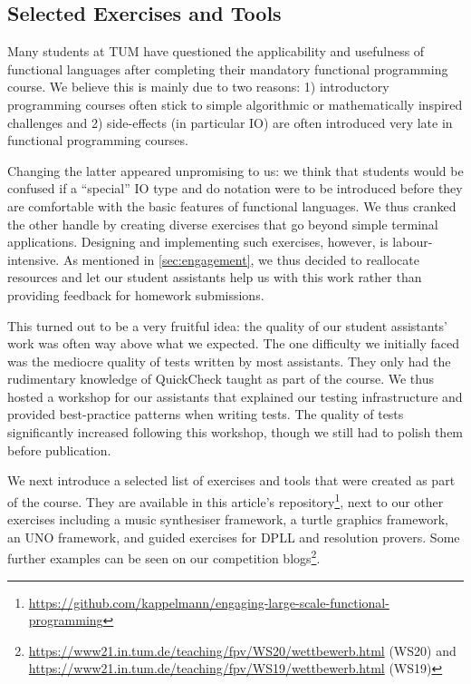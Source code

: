 \subsection{Selected Exercises and Tools}\label{sec:selected_exercises}

Many students at TUM have questioned the
applicability and usefulness
of functional languages after completing
their mandatory functional programming course.
We believe this is mainly due to two reasons:
1) introductory programming courses often stick
to simple algorithmic or mathematically inspired challenges and
2) side-effects (in particular IO)
are often introduced very late
in functional programming courses.

Changing the latter appeared unpromising to us:
we think that students would be confused
if a ``special'' IO type and do notation were to
be introduced before they are comfortable
with the basic features of functional
languages.
We thus cranked the other handle
by creating diverse exercises that go beyond
simple terminal applications.
Designing and implementing such exercises,
however, is labour-intensive.
As mentioned in \cref{sec:engagement},
we thus decided to reallocate resources and
let our student assistants help us with this work
rather than providing feedback for homework submissions.

This turned out to be a very fruitful idea:
the quality of our student assistants' work was often way above what
we expected.
The one difficulty we initially faced was the mediocre quality of
tests written by most assistants.
They only had the rudimentary knowledge of QuickCheck taught as part of
the course.
We thus hosted a workshop for our assistants that explained
our testing infrastructure and provided best-practice
patterns when writing tests.
The quality of tests significantly increased following this workshop,
though we still had to polish them before publication.

We next introduce a selected list of exercises and tools
that were created as part of the course.
They are available in this article's repository\footnote{\url{https://github.com/kappelmann/engaging-large-scale-functional-programming}},
next to our other exercises including
a music synthesiser framework,
a turtle graphics framework,
an UNO framework,
and guided exercises for DPLL and resolution provers.
Some further examples can be seen on our competition blogs\footnote{\url{https://www21.in.tum.de/teaching/fpv/WS20/wettbewerb.html} (WS20) and
\url{https://www21.in.tum.de/teaching/fpv/WS19/wettbewerb.html} (WS19)}.

